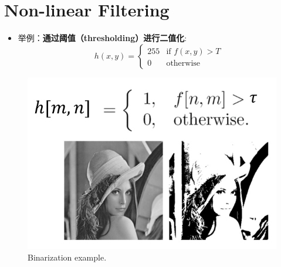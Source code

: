 \section{Non-linear Filtering}
\begin{itemize}
    \item 举例：\textbf{通过阈值（thresholding）进行二值化}:
    $$
    h(x,y) = 
    \begin{cases} 
    255 & \text{if } f(x,y) > T \\
    0   & \text{otherwise}
    \end{cases}
    $$
\end{itemize}

\begin{figure}[htbp]
    \centering
    \includegraphics[scale=0.4]{figures/BinarizationviaThresholding.png}
    \caption{Binarization example.}
\end{figure}